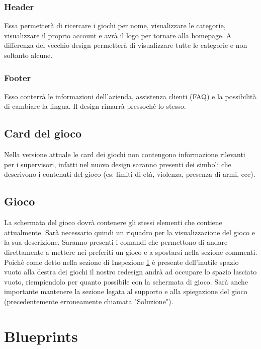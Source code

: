 \documentclass[../Report.tex]{subfiles}
\begin{document}
    \subsubsection{Header}
    Essa permetterà di ricercare i giochi per nome, visualizzare le categorie, visualizzare il proprio account e avrà il logo per tornare alla homepage. A differenza del vecchio design permetterà di visualizzare tutte le categorie e non soltanto alcune. 

    \subsubsection{Footer}
    Esso conterrà le informazioni dell'azienda, assistenza clienti (FAQ) e la possibilità di cambiare la lingua. Il design rimarrà pressoché lo stesso.
    
    \subsection{Card del gioco}
    Nella versione attuale le card dei giochi non contengono informazione rilevanti per i supervisori, infatti nel nuovo design saranno presenti dei simboli che descrivono i contenuti del gioco (es: limiti di età, violenza, presenza di armi, ecc).

    \subsection{Gioco}
    La schermata del gioco dovrà contenere gli stessi elementi che contiene attualmente. Sarà necessario quindi un riquadro per la visualizzazione del gioco e la sua descrizione. Saranno presenti i comandi che permettono di andare direttamente a mettere nei preferiti un gioco e a spostarsi nella sezione commenti. Poichè come detto nella sezione di Inspezione \ref{} è presente dell'inutile spazio vuoto alla destra dei giochi il nostro redesign andrà ad occupare lo spazio lasciato vuoto, riempiendolo per quanto possibile con la schermata di gioco. Sarà anche importante mantenere la sezione legata al supporto e alla spiegazione del gioco (precedentemente erroneamente chiamata "Soluzione").

    \section{Blueprints}
\end{document}
